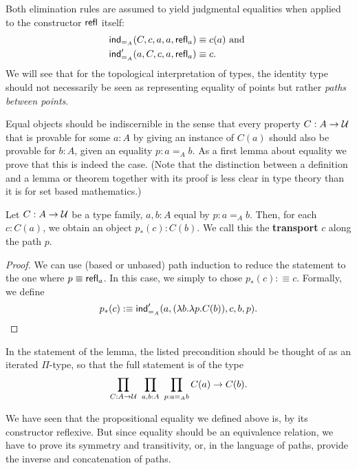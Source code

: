 Both elimination rules are assumed to yield judgmental equalities when applied
to the constructor $\mathsf{refl}$ itself:
\begin{align*}
\mathsf{ind}_{=_A}(C, c, a, a, \mathsf{refl}_a) &\equiv c(a) \text{ and } \\
\mathsf{ind}'_{=_A}(a, C, c, a, \mathsf{refl}_a) &\equiv c \text{.}
\end{align*}
We will see that for the topological interpretation of types, the identity type
should not necessarily be seen as representing equality of points but rather
\emph{paths between points}.

Equal objects should be indiscernible in the sense that every property $C : A \to \mathcal{U}$
that is provable for some $a : A$ by giving an instance of $C(a)$ should also be
provable for $b : A$, given an equality $p : a =_A b$.
As a first lemma about equality we prove that this is indeed the case.
(Note that the distinction between a definition and a lemma or theorem together
with its proof is less clear in type theory than it is for set based mathematics.)

\begin{lemma}[Transport.] \label{thm:transport-hott}
Let $C : A \to \mathcal{U}$ be a type family, $a , b : A$ equal by $p : a =_A b$.
Then, for each $c : C(a)$, we obtain an object $p_*(c) : C(b)$.
We call this the \textbf{transport} $c$ along the path $p$.
\end{lemma}

\begin{proof}
We can use (based or unbased) path induction to reduce the statement to the one
where $p \equiv \mathsf{refl}_a$.
In this case, we simply to chose $p_*(c) :\equiv c$.
Formally, we define
\begin{equation*}
p_*(c) :\equiv \mathsf{ind}'_{=_A}(a, (\lambda b. \lambda p. C(b)), c, b, p) \text{.}
\end{equation*}
\end{proof}
In the statement of the lemma, the listed precondition should be thought of as
an iterated $\Pi$-type, so that the full statement is of the type
\begin{equation*}
\prod_{C : A \to \mathcal{U}} ~ \prod_{a, b : A} ~ \prod_{p : a =_A b} C(a) \to C(b) \text{.}
\end{equation*}

We have seen that the propositional equality we defined above is, by its constructor
reflexive.
But since equality should be an equivalence relation, we have to prove its
symmetry and transitivity, or, in the language of paths, provide the inverse and
concatenation of paths.

